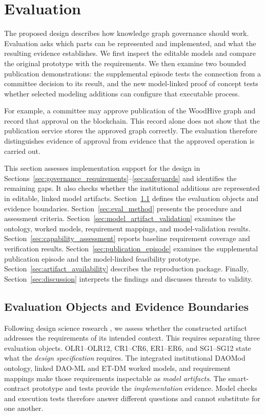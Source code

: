 \documentclass[journal]{IEEEtran}
\begin{document}
\section{Evaluation}
\label{sec:evaluation}

The proposed design describes how knowledge graph governance
should work. Evaluation asks which parts can be represented and
implemented, and what the resulting evidence establishes.
We first inspect the editable models and compare the original
prototype with the requirements. We then examine two bounded
publication demonstrations: the supplemental episode tests the
connection from a committee decision to its result, and the new
model-linked proof of concept tests whether selected modeling
additions can configure that executable process.

For example, a committee may approve publication of the
WoodHive graph and record that approval on the blockchain.
This record alone does not show that the publication service
stores the approved graph correctly. The evaluation therefore
distinguishes evidence of approval from evidence that the
approved operation is carried out.

This section
assesses implementation support for the design in
Sections~\ref{sec:governance_requirements}--\ref{sec:safeguards}
and identifies the remaining gaps. It also checks whether the
institutional additions are represented in editable, linked
model artifacts.
Section~\ref{sec:eval_boundary} defines the evaluation objects
and evidence boundaries. Section~\ref{sec:eval_method}
presents the procedure and assessment criteria.
Section~\ref{sec:model_artifact_validation} examines the ontology,
worked models, requirement mappings, and model-validation results.
Section~\ref{sec:capability_assessment} reports baseline
requirement coverage and verification results.
Section~\ref{sec:publication_episode} examines the supplemental
publication episode and the model-linked feasibility prototype.
Section~\ref{sec:artifact_availability} describes the
reproduction package. Finally, Section~\ref{sec:discussion}
interprets the findings and discusses threats to validity.

\subsection{Evaluation Objects and Evidence Boundaries}
\label{sec:eval_boundary}

Following design science research \cite{hevner2004design}, we assess
whether the constructed artifact addresses the requirements of its
intended context. This requires separating three evaluation objects.
OLR1--OLR12, CR1--CR6, ER1--ER6, and SG1--SG12 state what the
\emph{design specification} requires. The integrated institutional
DAOMod ontology, linked DAO-ML and ET-DM worked models, and requirement
mappings make those requirements inspectable as \emph{model artifacts}.
The smart-contract prototype and tests provide the \emph{implementation}
evidence. Model checks and execution tests therefore answer different
questions and cannot substitute for one another.
\end{document}

